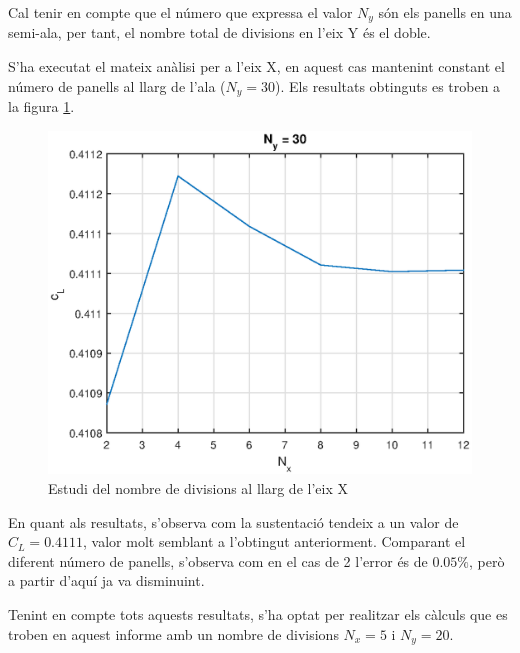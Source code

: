 Cal tenir en compte que el número que expressa el valor $N_{y}$ són els panells en una semi-ala, per tant, el nombre total de divisions en l'eix Y és el doble.

S'ha executat el mateix anàlisi per a l'eix X, en aquest cas mantenint constant el número de panells al llarg de l'ala ($N_{y}=30$). Els resultats obtinguts es troben a la figura \ref{nx}.

\begin{figure}[H]
	\centering
	\includegraphics[scale=0.95]{./plots/nxcl}
	\caption{Estudi del nombre de divisions al llarg de l'eix X}
	\label{nx}
\end{figure}

En quant als resultats, s'observa com la sustentació tendeix a un valor de $C_{L}=0.4111$, valor molt semblant a l'obtingut anteriorment. Comparant el diferent número de panells, s'observa com en el cas de 2 l'error és de $0.05\%$, però a partir d'aquí ja va disminuint.

Tenint en compte tots aquests resultats, s'ha optat per realitzar els càlculs que es troben en aquest informe amb un nombre de divisions $N_{x}=5$ i $N_{y}=20$.
